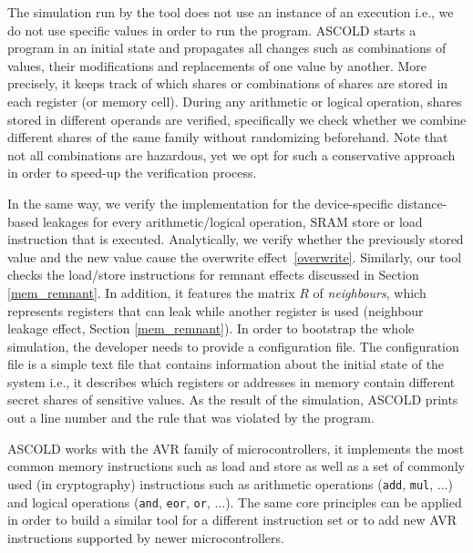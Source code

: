 The simulation run by the tool does not use an instance of an execution i.e.,
we do not use specific values in order to run the program.
ASCOLD starts a program in an initial state and propagates all changes
such as combinations of values, their modifications and replacements
of one value by another. More precisely, it keeps track of which shares
or combinations of shares are stored in each register (or memory cell).
During any arithmetic or logical operation, shares stored in different operands
are verified, specifically we check whether we combine different shares of the same family without randomizing beforehand. Note that not all combinations are hazardous, yet we opt for such a conservative approach in order to speed-up the verification process.

In the same way, we verify the implementation for the device-specific distance-based leakages 
for every arithmetic/logical operation, SRAM store or load instruction that is executed. Analytically, we verify whether
the previously stored value and the new value cause the overwrite effect~\ref{overwrite}. Similarly, our tool checks the load/store instructions for remnant effects discussed in Section \ref{mem_remnant}. In addition, it features the matrix $R$ of \emph{neighbours}, which represents registers that can leak while another register is used (neighbour leakage effect, Section \ref{mem_remnant}).
In order to bootstrap the whole simulation, the developer needs to provide
a configuration file. The configuration file is a simple text file that contains information about the initial
state of the system i.e., it describes which registers or addresses in memory contain different secret shares of sensitive values.
As the result of the simulation, ASCOLD prints out a line number and the rule that was violated
by the program.

ASCOLD works with the AVR family of microcontrollers, 
it implements the most common memory instructions such as load and store 
as well as a set of commonly used (in cryptography) instructions such as arithmetic operations
(\texttt{add}, \texttt{mul}, $\dots$) and logical operations (\texttt{and}, \texttt{eor}, \texttt{or}, $\dots$). The same core principles can be applied
in order to build a similar tool for a different instruction set or to add 
new AVR instructions supported by newer microcontrollers.

